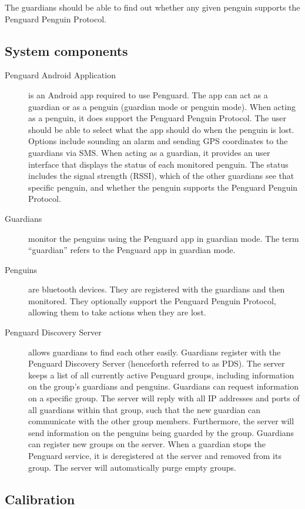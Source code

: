 \documentclass{report}
\begin{document}
The guardians should be able to find out whether any given penguin supports the Penguard Penguin Protocol.

\subsection{System components}

\begin{description}
    \item [Penguard Android Application] is an Android app required to use Penguard. The app can act as a guardian or as a penguin (guardian mode or penguin mode). When acting as a penguin, it does support the Penguard Penguin Protocol. The user should be able to select what the app should do when the penguin is lost. Options include sounding an alarm and sending GPS coordinates to the guardians via SMS. When acting as a guardian, it provides an user interface that displays the status of each monitored penguin. The status includes the signal strength (RSSI), which of the other guardians see that specific penguin, and whether the penguin supports the Penguard Penguin Protocol.
    \item [Guardians] monitor the penguins using the Penguard app in guardian mode. The term ``guardian'' refers to the Penguard app in guardian mode.
    \item [Penguins] are bluetooth devices. They are registered with the guardians and then monitored. They optionally support the Penguard Penguin Protocol, allowing them to take actions when they are lost.
    \item [Penguard Discovery Server] allows guardians to find each other easily. Guardians register with the Penguard Discovery Server (henceforth referred to as PDS). The server keeps a list of all currently active Penguard groups, including information on the group's guardians and penguins. Guardians can request information on a specific group. The server will reply with all IP addresses and ports of all guardians within that group, such that the new guardian can communicate with the other group members. Furthermore, the server will send information on the penguins being guarded by the group. Guardians can register new groups on the server. When a guardian stops the Penguard service, it is deregistered at the server and removed from its group. The server will automatically purge empty groups. 
\end{description}

\subsection{Calibration}
\end{document}
